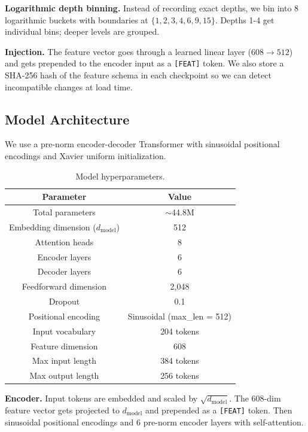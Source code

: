 \documentclass[conference]{IEEEtran}
\begin{document}
\textbf{Logarithmic depth binning.} Instead of recording exact depths, we bin into 8 logarithmic buckets with boundaries at $\{1, 2, 3, 4, 6, 9, 15\}$. Depths 1-4 get individual bins; deeper levels are grouped.

\textbf{Injection.} The feature vector goes through a learned linear layer ($608 \rightarrow 512$) and gets prepended to the encoder input as a \texttt{[FEAT]} token. We also store a SHA-256 hash of the feature schema in each checkpoint so we can detect incompatible changes at load time.

\subsection{Model Architecture}

We use a pre-norm encoder-decoder Transformer \cite{b34} with sinusoidal positional encodings \cite{b32} and Xavier uniform initialization.

\begin{table}[htbp]
\caption{Model hyperparameters.}
\begin{center}
\begin{tabular}{|c|c|}
\hline
\textbf{Parameter} & \textbf{Value} \\
\hline
Total parameters & $\sim$44.8M \\
\hline
Embedding dimension ($d_\text{model}$) & 512 \\
\hline
Attention heads & 8 \\
\hline
Encoder layers & 6 \\
\hline
Decoder layers & 6 \\
\hline
Feedforward dimension & 2,048 \\
\hline
Dropout & 0.1 \\
\hline
Positional encoding & Sinusoidal (max\_len = 512) \\
\hline
Input vocabulary & 204 tokens \\
\hline
Feature dimension & 608 \\
\hline
Max input length & 384 tokens \\
\hline
Max output length & 256 tokens \\
\hline
\end{tabular}
\label{tab:hyperparams}
\end{center}
\end{table}

\textbf{Encoder.} Input tokens are embedded and scaled by $\sqrt{d_\text{model}}$. The 608-dim feature vector gets projected to $d_\text{model}$ and prepended as a \texttt{[FEAT]} token. Then sinusoidal positional encodings and 6 pre-norm encoder layers with self-attention.
\end{document}
